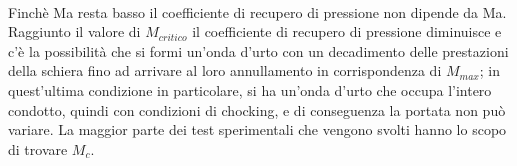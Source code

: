 \begin{figure}[h!]
\begin{minipage}{.4\textwidth}
  \label{fig:FuoriProgMach}
\end{minipage}
\end{figure}
\\Finchè Ma resta basso il coefficiente di recupero di pressione non dipende da Ma. Raggiunto il valore di $M_{critico}$ il coefficiente di recupero di pressione diminuisce e c'è la possibilità che si formi un'onda d'urto con un decadimento delle prestazioni della schiera fino ad arrivare al loro annullamento in corrispondenza di $M_{max}$; in quest'ultima condizione in particolare, si ha un'onda d'urto che occupa l'intero condotto, quindi con condizioni di chocking, e di conseguenza la portata non può variare. La maggior parte dei test sperimentali che vengono svolti hanno lo scopo di trovare $M_c$.
